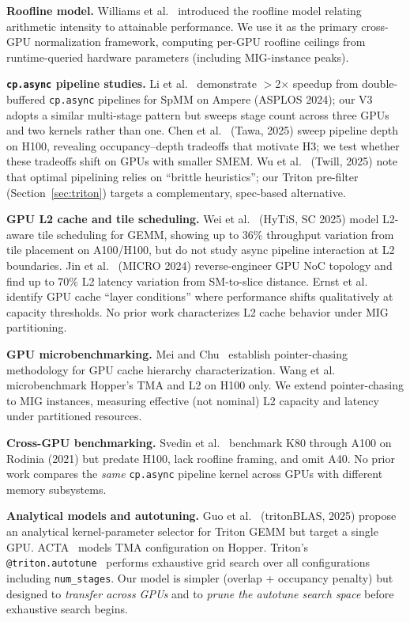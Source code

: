 \documentclass[sigplan,nonacm,10pt]{acmart}
\begin{document}
\textbf{Roofline model.}
Williams et al.~\cite{roofline} introduced the roofline model relating
arithmetic intensity to attainable performance.  We use it as the
primary cross-GPU normalization framework, computing per-GPU roofline
ceilings from runtime-queried hardware parameters (including
MIG-instance peaks).

\textbf{\texttt{cp.async} pipeline studies.}
Li et al.~\cite{dtcspmm} demonstrate $>$2$\times$ speedup from
double-buffered \texttt{cp.async} pipelines for SpMM on Ampere (ASPLOS
2024); our V3 adopts a similar multi-stage pattern but sweeps stage
count across three GPUs and two kernels rather than one.
Chen et al.~\cite{tawa} (Tawa, 2025) sweep pipeline depth on H100,
revealing occupancy--depth tradeoffs that motivate H3; we test whether
these tradeoffs shift on GPUs with smaller SMEM.
Wu et al.~\cite{twill} (Twill, 2025) note that optimal pipelining
relies on ``brittle heuristics''; our Triton pre-filter
(Section~\ref{sec:triton}) targets a complementary, spec-based
alternative.

\textbf{GPU L2 cache and tile scheduling.}
Wei et al.~\cite{hytis} (HyTiS, SC 2025) model L2-aware tile
scheduling for GEMM, showing up to 36\% throughput variation from tile
placement on A100/H100, but do not study async pipeline interaction
at L2 boundaries.
Jin et al.~\cite{gpu_noc} (MICRO 2024) reverse-engineer GPU NoC
topology and find up to 70\% L2 latency variation from SM-to-slice
distance.
Ernst et al.~\cite{layer_conditions} identify GPU cache ``layer
conditions'' where performance shifts qualitatively at capacity
thresholds.
No prior work characterizes L2 cache behavior under MIG partitioning.

\textbf{GPU microbenchmarking.}
Mei and Chu~\cite{mei_dissecting} establish pointer-chasing methodology
for GPU cache hierarchy characterization.
Wang et al.~\cite{hopper_microbench} microbenchmark Hopper's TMA and
L2 on H100 only.
We extend pointer-chasing to MIG instances, measuring effective
(not nominal) L2 capacity and latency under partitioned resources.

\textbf{Cross-GPU benchmarking.}
Svedin et al.~\cite{svedin_lineage} benchmark K80 through A100 on
Rodinia (2021) but predate H100, lack roofline framing, and omit A40.
No prior work compares the \emph{same} \texttt{cp.async} pipeline
kernel across GPUs with different memory subsystems.

\textbf{Analytical models and autotuning.}
Guo et al.~\cite{tritonblas} (tritonBLAS, 2025) propose an analytical
kernel-parameter selector for Triton GEMM but target a single GPU.
ACTA~\cite{acta} models TMA configuration on Hopper.
Triton's \texttt{@triton.autotune}~\cite{triton} performs exhaustive
grid search over all configurations including \texttt{num\_stages}.
Our model is simpler (overlap + occupancy penalty) but designed to
\emph{transfer across GPUs} and to \emph{prune the autotune search
space} before exhaustive search begins.
\end{document}
